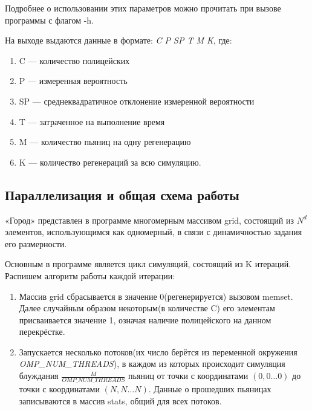 \documentclass{article}
\begin{document}
    Подробнее о использовании этих параметров можно прочитать при вызове программы с флагом -h.

    На выходе выдаются данные в формате: \textit{C P SP T M K}, где:
    \begin{enumerate}[1.]
        \item C — количество полицейских
        \item P — измеренная вероятность
        \item SP — среднеквадратичное отклонение измеренной вероятности
        \item T — затраченное на выполнение время
        \item M — количество пьяниц на одну регенерацию
        \item K — количество регенераций за всю симуляцию.
    \end{enumerate}
    \pagebreak

    \subsection{Параллелизация и общая схема работы}
    «Город» представлен в программе многомерным массивом grid, состоящий из $N^{d}$ элементов, использующимся как одномерный, в связи с динамичностью задания его размерности.

    Основным в программе является цикл симуляций, состоящий из K итераций.
    Распишем алгоритм работы каждой итерации:
    \begin{enumerate}[1.]
        \item Массив grid сбрасывается в значение 0(регенерируется) вызовом memset. Далее случайным образом некоторым(в количестве C) его элементам присваивается значение 1, означая наличие полицейского на данном перекрёстке.
        \item Запускается несколько потоков(их число берётся из переменной окружения \textit{OMP\_NUM\_THREADS}), в каждом из которых происходит симуляция блуждания $\frac{M}{OMP\_NUM\_THREADS}$ пьяниц от точки с координатами $(0, 0 … 0)$ до точки с координатами $(N, N … N)$. Данные о прошедших пьяницах записываются в массив stats, общий для всех потоков.
    \end{enumerate}
\end{document}
